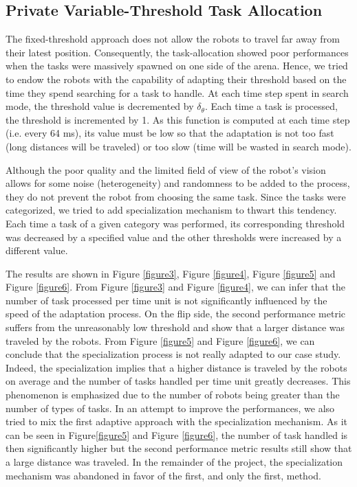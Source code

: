 \subsection{Private Variable-Threshold Task Allocation}
The fixed-threshold approach does not allow the robots to travel far away from their latest position. Consequently, the task-allocation showed poor performances when the tasks were massively spawned on one side of the arena. Hence, we tried to endow the robots with the capability of adapting their threshold based on the time they spend searching for a task to handle. At each time step spent in search mode, the threshold value is decremented by $\delta_{\theta}$. Each time a task is processed, the threshold is incremented by 1. As this function is computed at each time step (i.e. every 64 ms), its value must be low so that the adaptation is not too fast (long distances will be traveled) or too slow (time will be wasted in search mode).

Although the poor quality and the limited field of view of the robot's vision allows for some noise (heterogeneity) and randomness to be added to the process, they do not prevent the robot from choosing the same task. Since the tasks were categorized, we tried to add specialization mechanism to thwart this tendency. Each time a task of a given category was performed, its corresponding threshold was decreased by a specified value and the other thresholds were increased by a different value.

The results are shown in Figure \ref{figure3}, Figure \ref{figure4}, Figure \ref{figure5} and Figure \ref{figure6}. From Figure \ref{figure3} and Figure \ref{figure4}, we can infer that the number of task processed per time unit is not significantly influenced by the speed of the adaptation process. On the flip side, the second performance metric suffers from the unreasonably low threshold and show that a larger distance was traveled by the robots. From Figure \ref{figure5} and Figure \ref{figure6}, we can conclude that the specialization process is not really adapted to our case study. Indeed, the specialization implies that a higher distance is traveled by the robots on average and the number of tasks handled per time unit greatly decreases. This phenomenon is emphasized due to the number of robots being greater than the number of types of tasks. In an attempt to improve the performances, we also tried to mix the first adaptive approach with the specialization mechanism. As it can be seen in Figure\ref{figure5} and Figure \ref{figure6}, the number of task handled is then significantly higher but the second performance metric results still show that a large distance was traveled. In the remainder of the project, the specialization mechanism was abandoned in favor of the first, and only the first, method.


